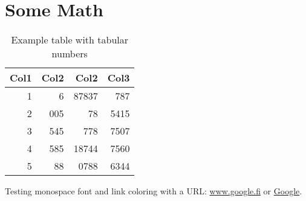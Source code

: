 \documentclass[11pt, a4paper, oneside]{article}
\title{\docsubject}
\author{\docauthor}
\date{\today}
\begin{document}
\maketitle

\blinddocument
\clearpage

\section{Some Math} \label{sec:some-math}
\blindmathpaper
\begin{table}[t]
    \centering
    \renewcommand{\arraystretch}{1.2}
    \setlength{\tabcolsep}{16pt}
    \caption[Example table]{Example table with tabular numbers}
    \begin{tabular}{rrrr}
        \toprule
        \textbf{Col1} & \textbf{Col2} & \textbf{Col2} & \textbf{Col3} \\
        \midrule
        1             & 6             & 87837         & 787           \\
        2             & 005           & 78            & 5415          \\
        3             & 545           & 778           & 7507          \\
        4             & 585           & 18744         & 7560          \\
        5             & 88            & 0788          & 6344          \\
        \bottomrule
    \end{tabular}
    \label{tab:example}
\end{table}

Testing monospace font and link coloring with a URL: \url{www.google.fi} or \href{www.google.fi}{Google}.
\end{document}
